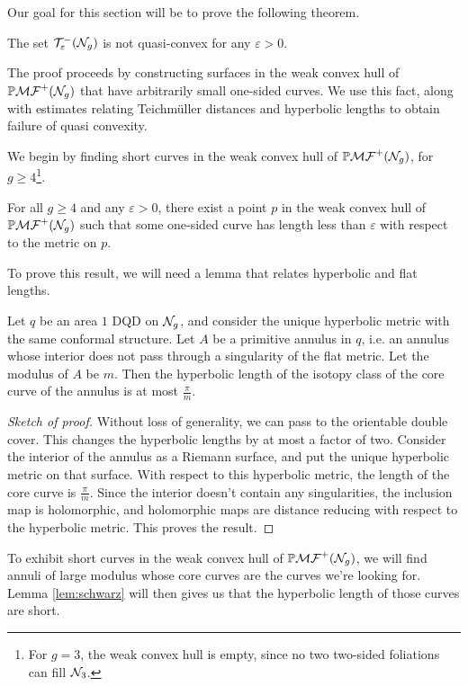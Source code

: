 \documentclass[12pt, reqno]{amsart}
\begin{document}
Our goal for this section will be to prove the following theorem.
\begin{theorem}
  \label{thm:qc-fail}
  The set $\mathcal{T}_{\varepsilon}^{-}(\mathcal{N}_g)$ is not quasi-convex for any $\varepsilon > 0$.
\end{theorem}
The proof proceeds by constructing surfaces in the weak convex hull of $\mathbb{P}\mathcal{MF}^+(\mathcal{N}_g)$ that have arbitrarily small one-sided curves.
We use this fact, along with estimates relating Teichm\"uller distances and hyperbolic lengths to obtain failure of quasi convexity.

We begin by finding short curves in the weak convex hull of $\mathbb{P}\mathcal{MF}^+(\mathcal{N}_g)$, for $g \geq 4$\footnote{For $g = 3$, the weak convex hull is empty, since no two two-sided foliations can fill $\mathcal{N}_3$.}.
\begin{proposition}
  \label{prop:very-short-curves}
  For all $g \geq 4$ and any $\varepsilon > 0$, there exist a point $p$ in the weak convex hull of $\mathbb{P}\mathcal{MF}^+(\mathcal{N}_g)$ such that some one-sided curve has length less than $\varepsilon$ with respect to the metric on $p$.
\end{proposition}

To prove this result, we will need a lemma that relates hyperbolic and flat lengths.
\begin{lemma}
  \label{lem:schwarz}
  Let $q$ be an area $1$ DQD on $\mathcal{N}_g$, and consider the unique hyperbolic metric with the same conformal structure.
  Let $A$ be a primitive annulus in $q$, i.e. an annulus whose interior does not pass  through a singularity of the flat metric.
  Let the modulus of $A$ be $m$.
  Then the hyperbolic length of the isotopy class of the core curve of the annulus is at most $\frac{\pi}{m}$.
\end{lemma}
\begin{proof}[Sketch of proof]
  Without loss of generality, we can pass to the orientable double cover.
  This changes the hyperbolic lengths by at most a factor of two.
  Consider the interior of the annulus as a Riemann surface, and put the unique hyperbolic metric on that surface.
  With respect to this hyperbolic metric, the length of the core curve is $\frac{\pi}{m}$. Since the interior doesn't contain any singularities, the inclusion map is holomorphic, and holomorphic maps are distance reducing with respect to the hyperbolic metric.
  This proves the result.
\end{proof}
To exhibit short curves in the weak convex hull of $\mathbb{P}\mathcal{MF}^+(\mathcal{N}_g)$, we will find annuli of large modulus whose core curves are the curves we're looking for.
Lemma \ref{lem:schwarz} will then gives us that the hyperbolic length of those curves are short.
\end{document}
